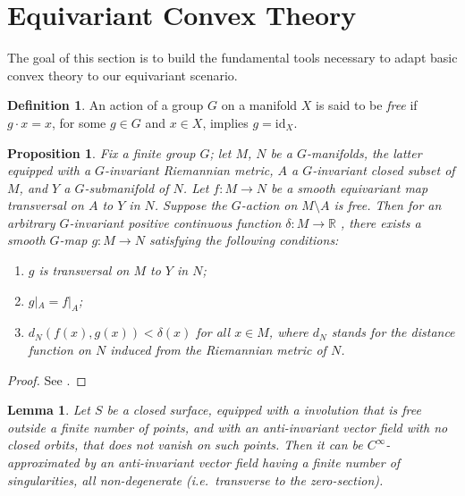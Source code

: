 \documentclass[a4paper, 11pt]{amsart}
\theoremstyle{plain}
\newtheorem{prop}{Proposition}[section]
\newtheorem{lemma}[lemma]{Lemma}
\theoremstyle{definition}
\newtheorem{defin}[defin]{Definition}
\newcommand{\R}{\mathbb{R}}
\newcommand{\id}{\text{id}}
\begin{document}
\section{Equivariant Convex Theory}\label{sec:EConvex}
The goal of this section is to build the fundamental tools necessary to adapt basic convex theory to our equivariant scenario.
\begin{defin}
	An action of a group $G$ on a manifold $X$ is said to be \emph{free} if $g\cdot x = x$, for some $g \in G$ and $x \in X$, implies $g = \id_X$.
\end{defin}

\begin{prop}\label{Gtrasv}
	Fix a finite group $G$; let $M$, $N$ be a $G$-manifolds, the latter equipped with a $G$-invariant Riemannian metric, $A$ a $G$-invariant closed subset of $M$, and $Y$ a $G$-submanifold of $N$. Let $f\colon M \to N$ be a smooth equivariant map transversal on $A$ to $Y$ in $N$. Suppose the $G$-action on $M \setminus A$ is free. Then for an arbitrary $G$-invariant positive continuous function $\delta \colon M \to \R$ , there exists a smooth $G$-map $g \colon M \to N$ satisfying the following conditions:
	\begin{enumerate}
	\item $g$ is transversal on $M$ to $Y$ in $N$;
	\item $g|_{A}=f|_{A}$;
	\item $d_{N}(f(x),g(x))<\delta(x)$ for all $x \in M$, where $d_{N}$ stands for the distance function on $N$ induced from the Riemannian metric of $N$.
	\end{enumerate}
\end{prop}
\begin{proof}
	See \cite[Thm.\ 1.1]{morimotoEQUIVARIANTTRANSVERSALITYTHEOREM2014}.
\end{proof}
\begin{lemma}\label{nondegequiv}
	Let $S$ be a closed surface, equipped with a involution that is free outside a finite number of points, and with an anti-invariant vector field with no closed orbits, that does not vanish on such points. Then it can be $C^\infty$-approximated by an anti-invariant vector field having a finite number of singularities, all non-degenerate (i.e.\ transverse to the zero-section).
\end{lemma}
\end{document}
